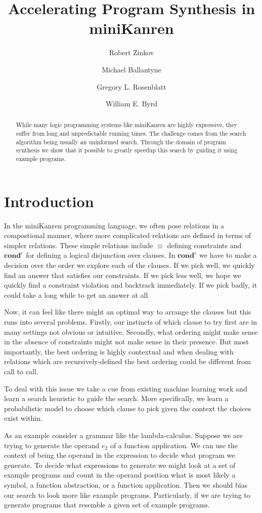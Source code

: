 \documentclass[submission,copyright,creativecommons]{eptcs}
\title{Accelerating Program Synthesis in miniKanren}
\author{Robert Zinkov
\institute{University of Oxford \\
Oxford, UK}
\email{zinkov@robots.ox.ac.uk}
\and
Michael Ballantyne
\institute{Northeastern University\\
Boston, MA, USA}
\email{ballantyne.m@northeastern.edu}
\and
Gregory L. Rosenblatt
\institute{University of Alabama at Birmingham\\
Birmingham, AL, USA}
\email{gregr@uab.edu}
\and
William E. Byrd
\institute{University of Alabama at Birmingham\\
Birmingham, AL, USA}
\email{webyrd@uab.edu}
}
\begin{document}
\maketitle

\begin{abstract}
  While many logic programming systems like miniKanren are highly
  expressive, they suffer from long and unpredictable running times.
  The challenge comes from the search algorithm being usually an
  uninformed search. Through the domain of program synthesis
  we show that it possible to greatly speedup this search by guiding
  it using example programs.
  
\end{abstract}

\section{Introduction}

In the miniKanren\cite{byrd2017unified} programming language, we often
pose relations in a compostional manner, where more complicated
relations are defined in terms of simpler relations. These simple
relations include $\equiv$ defining constraints and $\textbf{cond}^e$
for defining a logical disjunction over clauses. In $\textbf{cond}^e$
we have to make a decision over the order we explore each of the
clauses. If we pick well, we quickly find an answer that satisfies our
constraints. If we pick less well, we hope we quickly find a
constraint violation and backtrack immediately. If we pick badly, it
could take a long while to get an answer at all.

Now, it can feel like there might an optimal way to arrange the
clauses but this runs into several problems. Firstly, our instincts of
which clause to try first are in many settings not obvious or intuitive. Secondly,
what ordering might make sense in the absence of constraints might not make
sense in their presence. But most importantly, the best ordering is highly
contextual and when dealing with relations which are recursively-defined
the best ordering could be different from call to call.

To deal with this issue we take a cue from existing machine learning
work\cite{zaremba2014learning,lee2018accelerating} and learn a search
heuristic to guide the search. More specifically, we learn a
probabilistic model to choose which clause to pick given the context the
choices exist within.

As an example consider a grammar like the lambda-calculus. Suppose we
are trying to generate the operand $e_2$ of a function application. We
can use the context of being the operand in the expression to decide
what program we generate. To decide what expressions to generate we
might look at a set of example programs and count in the operand
position what is most likely a symbol, a function abstraction, or a
function application. Then we should bias our search to look more like
example programs. Particularly, if we are trying to generate programs
that resemble a given set of example programs.
\end{document}
